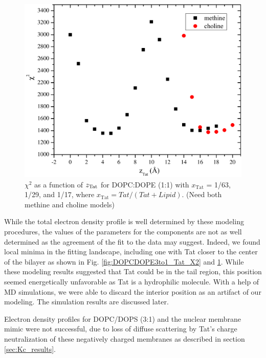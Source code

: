 \begin{figure}[htbp]
  \includegraphics[scale=0.3]{figures/Tat/SDP_Results/X2/DOPCDOPE1to1_Tat_16to1_3p0_X2}
  \caption{$\chi^2$ as a function of $z_\textrm{Tat}$ for DOPC:DOPE (1:1) with 
  $x_\textrm{Tat}$ = 1/63, 1/29, and 1/17, where $x_\textrm{Tat}=Tat/(Tat+Lipid)$.
  (Need both methine and choline models)}
  \label{fig:DOPCDOPE1to1_Tat_X2}
\end{figure}

While the total electron density profile is well determined by 
these modeling procedures, the values of the parameters for the components are not as well 
determined as the agreement of the fit to the data may suggest. 
Indeed, we found local
minima in the fitting landscape, including one with Tat closer to the center 
of the bilayer as
shown in Fig. \ref{fig:DOPCDOPE3to1_Tat_X2} and \ref{fig:DOPCDOPE1to1_Tat_X2}. 
While these modeling results suggested
that Tat could be in the tail region, this position seemed energetically 
unfavorable as Tat is a hydrophilic molecule. With a help of MD simulations,
we were able to discard the interior position as an artifact of our 
modeling. The simulation results are discussed later.

Electron density profiles for DOPC/DOPS (3:1) and the nuclear membrane 
mimic were not
successful, due to loss of diffuse scattering by Tat’s charge neutralization 
of these negatively
charged membranes as described in section \ref{sec:Kc_results}.

